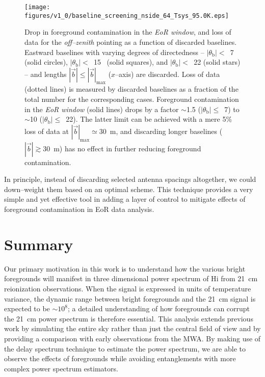 \documentclass[preprint2,iop,numberedappendix]{emulateapj}
\begin{document}
\begin{figure}[htb]
\centering
\texttt{[image: figures/v1\_0/baseline\_screening\_nside\_64\_Tsys\_95.0K.eps]}
\caption{Drop in foreground contamination in the {\it EoR window}, and loss of data for the {\it off--zenith} pointing as a function of discarded baselines. Eastward baselines with varying degrees of directedness -- $|\theta_\textrm{b}|<$~7 (solid circles), $|\theta_\textrm{b}|<$~15\arcdeg~ (solid squares), and $|\theta_\textrm{b}|<$~22 (solid stars) -- and lengths $|\vec{b}| \le |\vec{b}|_\textrm{max}$ ($x$--axis) are discarded. Loss of data (dotted lines) is measured by discarded baselines as a fraction of the total number for the corresponding cases. Foreground contamination in the {\it EoR window} (solid lines) drops by a factor $\sim$1.5 ($|\theta_\textrm{b}|\le$~7) to $\sim$10 ($|\theta_\textrm{b}|\le$~22). The latter limit can be achieved with a mere 5\% loss of data at $|\vec{b}|_\textrm{max}\simeq30$~m, and discarding longer baselines ($|\vec{b}|\gtrsim 30$~m) has no effect in further reducing foreground contamination. \label{fig:screening}}
\end{figure}

In principle, instead of discarding selected antenna spacings altogether, we could down--weight them based on an optimal scheme. This technique provides a very simple and yet effective tool in adding a layer of control to mitigate effects of foreground contamination in EoR data analysis. %

\section{Summary}\label{sec:summary}

Our primary motivation in this work is to understand how the various bright foregrounds will manifest in three dimensional power spectrum of H{\sc i} from 21~cm reionization observations. When the signal is expressed in units of temperature variance, the dynamic range between bright foregrounds and the 21~cm signal is expected to be $\sim 10^8$; a detailed understanding of how foregrounds can corrupt the 21~cm power spectrum is therefore essential. This analysis extends previous work by simulating the entire sky rather than just the central field of view and by providing a comparison with early observations from the MWA. By making use of the delay spectrum technique to estimate the power spectrum, we are able to observe the effects of foregrounds while avoiding entanglements with more complex power spectrum estimators.  
\end{document}
